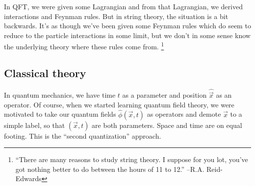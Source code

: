 In QFT, we were given some Lagrangian and from that Lagrangian, we derived interactions and Feynman rules. But in string theory, the situation is a bit backwards. It's as though we've been given some Feynman rules which do seem to reduce to the particle interactions in some limit, but we don't in some sense know the underlying theory where these rules come from.%
    \footnote{``There are many reasons to study string theory. I suppose for you lot, you've got nothing better to do between the hours of 11 to 12.'' --R.A. Reid-Edwards}

\subsection*{Classical theory} In quantum mechanics, we have time $t$ as a parameter and position $\hat{\vec x}$ as an operator. Of course, when we started learning quantum field theory, we were motivated to take our quantum fields $\hat \phi(\vec x,t)$ as operators and demote $\vec x$ to a simple label, so that $(\vec x,t)$ are both parameters. Space and time are on equal footing. This is the ``second quantization'' approach.

